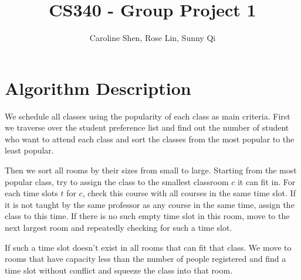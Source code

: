 \documentclass[11pt, oneside]{article}   	%
\title{CS340 - Group Project 1}
\author{Caroline Shen, Rose Lin, Sunny Qi}
\date{}							%
\begin{document}
\maketitle


\section{Algorithm Description}
We schedule all classes using the popularity of each class as main criteria. First we traverse over the student preference list and find out the number of student who want to attend each class and sort the classes from the most popular to the least popular. 

Then we sort all rooms by their sizes from small to large. Starting from the most popular class, try to assign the class to the smallest classroom $c$ it can fit in. For each time slots $t$ for $c$, check this course with all courses in the same time slot. If it is not taught by the same professor as any course in the same time, assign the class to this time. If there is no such empty time slot in this room, move to the next largest room and repeatedly checking for such a time slot. 

If such a time slot doesn't exist in all rooms that can fit that class. We move to rooms that have capacity less than the number of people registered and find a time slot without conflict and squeeze the class into that room. 

\section{}
\begin{algorithm}[H]
\end{algorithm}
\end{document}
